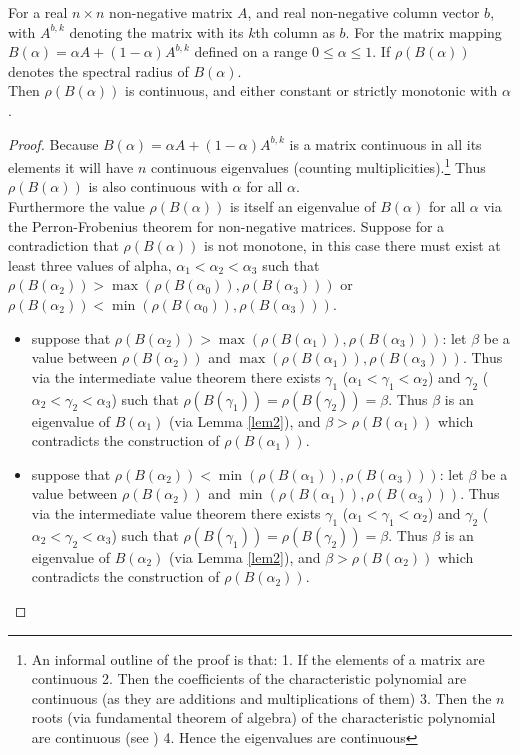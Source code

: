 \begin{theorem}\label{th:2}
For a real $n\times n$ non-negative matrix $A$, and real non-negative column vector $b$, with $A^{b,k}$ denoting the matrix with its $k$th column as $b$.
For the matrix mapping $B(\alpha) = \alpha A + (1-\alpha)A^{b,k}$ defined on a range $0\le\alpha\le1$. If $\rho(B(\alpha))$ denotes the spectral radius of $B(\alpha)$.\\ Then $\rho(B(\alpha))$ is continuous, and either constant or strictly monotonic with $\alpha$.
\end{theorem}
\begin{proof}
Because $B(\alpha) = \alpha A + (1-\alpha)A^{b,k}$ is a matrix continuous in all its elements it will have $n$ continuous eigenvalues (counting multiplicities).\footnote{An informal outline of the proof is that: 1. If the elements of a matrix are continuous 2. Then the coefficients of the characteristic polynomial are continuous (as they are additions and multiplications of them) 3. Then the $n$ roots (via fundamental theorem of algebra) of the characteristic polynomial are continuous (see \cite{10.2307/2045978}) 4. Hence the eigenvalues are continuous}
Thus $\rho(B(\alpha))$ is also continuous with $\alpha$ for all $\alpha$.\\
Furthermore the value $\rho(B(\alpha))$ is itself an eigenvalue of $B(\alpha)$ for all $\alpha$ via the Perron-Frobenius theorem for non-negative matrices.
Suppose for a contradiction that $\rho(B(\alpha))$ is not monotone, in this case there must exist at least three values of alpha, $\alpha_1<\alpha_2<\alpha_3$ such that $\rho(B(\alpha_2))>\max(\rho(B(\alpha_0)),\rho(B(\alpha_3)))$ or $\rho(B(\alpha_2))<\min(\rho(B(\alpha_0)),\rho(B(\alpha_3)))$.
\begin{itemize}
\item	suppose that $\rho(B(\alpha_2))>\max(\rho(B(\alpha_1)),\rho(B(\alpha_3)))$: let $\beta$ be a value between $\rho(B(\alpha_2))$ and $\max(\rho(B(\alpha_1)),\rho(B(\alpha_3)))$. Thus via the intermediate value theorem there exists $\gamma_1$ ($\alpha_1<\gamma_1<\alpha_2$) and $\gamma_2$ ($\alpha_2<\gamma_2<\alpha_3$) such that $\rho(B(\gamma_1))=\rho(B(\gamma_2))=\beta$. Thus $\beta$ is an eigenvalue of $B(\alpha_1)$ (via Lemma \ref{lem2}), and $\beta > \rho(B(\alpha_1))$ which contradicts the construction of $\rho(B(\alpha_1))$.
\item   suppose that $\rho(B(\alpha_2))<\min(\rho(B(\alpha_1)),\rho(B(\alpha_3)))$: let $\beta$ be a value between $\rho(B(\alpha_2))$ and $\min(\rho(B(\alpha_1)),\rho(B(\alpha_3)))$. Thus via the intermediate value theorem there exists $\gamma_1$ ($\alpha_1<\gamma_1<\alpha_2$) and $\gamma_2$ ($\alpha_2<\gamma_2<\alpha_3$) such that $\rho(B(\gamma_1))=\rho(B(\gamma_2))=\beta$. Thus $\beta$ is an eigenvalue of $B(\alpha_2)$ (via Lemma \ref{lem2}), and $\beta > \rho(B(\alpha_2))$ which contradicts the construction of $\rho(B(\alpha_2))$.

\end{itemize}
\end{proof}

